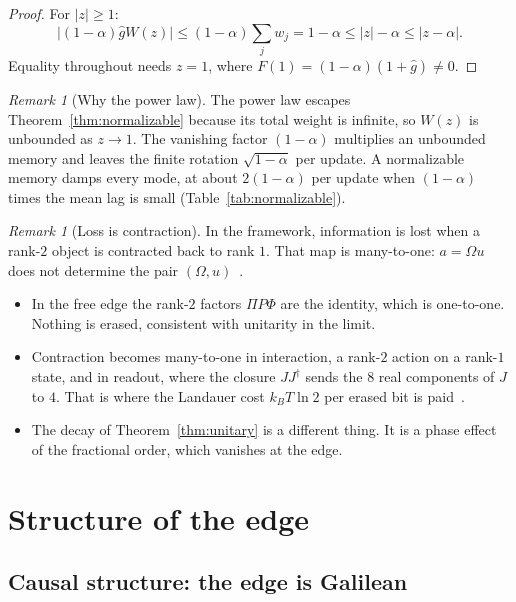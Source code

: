 \documentclass[11pt]{amsart}
\theoremstyle{definition}
\theoremstyle{remark}
\newtheorem{remark}[theorem]{Remark}
\begin{document}
\begin{proof}
For $\lvert z\rvert\ge1$:
\[
\lvert(1-\alpha)\hat gW(z)\rvert\le(1-\alpha)\sum_jw_j=1-\alpha\le\lvert z\rvert-\alpha\le\lvert z-\alpha\rvert .
\]
Equality throughout needs $z=1$, where $F(1)=(1-\alpha)(1+\hat g)\neq0$. \end{proof}

\begin{remark}[Why the power law]\label{rem:powerlaw}
The power law escapes Theorem~\ref{thm:normalizable} because its total weight is infinite, so $W(z)$ is unbounded as $z\to1$. The vanishing factor $(1-\alpha)$ multiplies an unbounded memory and leaves the finite rotation $\sqrt{1-\alpha}$ per update. A normalizable memory damps every mode, at about $2(1-\alpha)$ per update when $(1-\alpha)$ times the mean lag is small (Table~\ref{tab:normalizable}).
\end{remark}

\begin{remark}[Loss is contraction]\label{rem:loss}
In the framework, information is lost when a rank-$2$ object is contracted back to rank $1$. That map is many-to-one: $a=\Omega u$ does not determine the pair $(\Omega,u)$~\cite[Sec.~2]{Info}.
\begin{itemize}
\item In the free edge the rank-$2$ factors $\Pi P\Phi$ are the identity, which is one-to-one. Nothing is erased, consistent with unitarity in the limit.
\item Contraction becomes many-to-one in interaction, a rank-$2$ action on a rank-$1$ state, and in readout, where the closure $JJ^\dagger$ sends the $8$ real components of $J$ to $4$. That is where the Landauer cost $k_BT\ln2$ per erased bit is paid~\cite{Landauer}.
\item The decay of Theorem~\ref{thm:unitary} is a different thing. It is a phase effect of the fractional order, which vanishes at the edge.
\end{itemize}
\end{remark}

\section{Structure of the edge}\label{sec:structure}

\subsection{Causal structure: the edge is Galilean}\label{sec:galilean}
\end{document}

